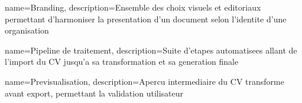 {
    name=Branding,
    description={Ensemble des choix visuels et editoriaux permettant d'harmoniser la presentation d'un document selon l'identite d'une organisation}
}

{
    name=Pipeline de traitement,
    description={Suite d'etapes automatisees allant de l'import du CV jusqu'a sa transformation et sa generation finale}
}

{
    name=Previsualisation,
    description={Apercu intermediaire du CV transforme avant export, permettant la validation utilisateur}
}